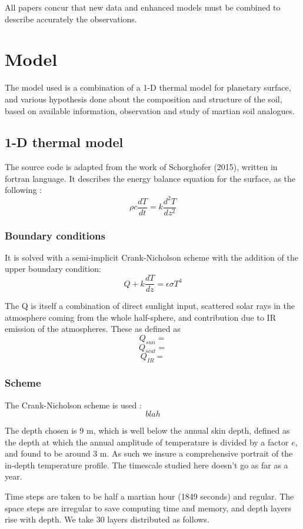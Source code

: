 \documentclass{report}
\begin{document}
All papers concur that new data and enhanced models must be combined to describe accurately the observations. 

\chapter{Model}
The model used is a combination of a 1-D thermal model for planetary surface, and various hypothesis done about the composition and structure of the soil, based on available information, observation and study of martian soil analogues. 

\section{1-D thermal model}
The source code is adapted from the work of Schorghofer (2015), written in fortran language. 
It describes the energy balance equation for the surface, as the following :
\[\rho c \frac{dT}{dt}=k\frac{d^2 T}{dz^2}\]

    \subsection{Boundary conditions}
It is solved with a semi-implicit Crank-Nicholson scheme with the addition of the upper boundary condition: 
\[Q + k \frac{dT}{dz} = \epsilon \sigma T^4\] 

The Q is itself a combination of direct sunlight input, scattered solar rays in the atmosphere coming from the whole half-sphere, and contribution due to IR emission of the atmospheres. These as defined as 
\[Q_{sun} = \]
\[Q_{scat} = \]
\[Q_{IR} = \]
    
    \subsection{Scheme}
The Crank-Nicholson scheme is used :
\[ blah \]

The depth chosen is 9 m, which is well below the annual skin depth, defined as the depth at which the annual amplitude of temperature is divided by a factor $e$, and found to be around 3 m. As such we insure a comprehensive portrait of the in-depth temperature profile. The timescale studied here doesn't go as far as a year.

Time steps are taken to be half a martian hour (1849 seconds) and regular. The space steps are irregular to save computing time and memory, and depth layers rise with depth. We take 30 layers distributed as follows. 
\end{document}
